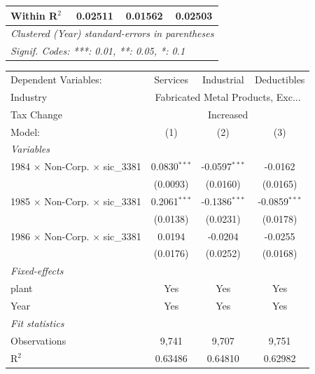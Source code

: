 \documentclass[
  12pt]{article}
\theoremstyle{definition}
\theoremstyle{remark}
\begin{document}
\begin{table}
\begin{minipage}{\linewidth}
\begin{tabular}{lccc}
   Within R$^2$                                  & 0.02511         & 0.01562    & 0.02503\\  
   \midrule \midrule
   \multicolumn{4}{l}{\emph{Clustered (Year) standard-errors in parentheses}}\\
   \multicolumn{4}{l}{\emph{Signif. Codes: ***: 0.01, **: 0.05, *: 0.1}}\\
\end{tabular}
\par\endgroup
\begingroup
\centering
\begin{tabular}{lccc}
   \tabularnewline \midrule \midrule
   Dependent Variables:                          & Services       & Industrial      & Deductibles\\  
   Industry & \multicolumn{3}{c}{Fabricated Metal Products, Exc...} \\ 
   Tax Change & \multicolumn{3}{c}{Increased} \\ 
   Model:                                        & (1)            & (2)             & (3)\\  
   \midrule
   \emph{Variables}\\
   1984 $\times$ Non-Corp. $\times$ sic\_3381    & 0.0830$^{***}$ & -0.0597$^{***}$ & -0.0162\\   
                                                 & (0.0093)       & (0.0160)        & (0.0165)\\   
   1985 $\times$ Non-Corp. $\times$ sic\_3381    & 0.2061$^{***}$ & -0.1386$^{***}$ & -0.0859$^{***}$\\   
                                                 & (0.0138)       & (0.0231)        & (0.0178)\\   
   1986 $\times$ Non-Corp. $\times$ sic\_3381    & 0.0194         & -0.0204         & -0.0255\\   
                                                 & (0.0176)       & (0.0252)        & (0.0168)\\   
   \midrule
   \emph{Fixed-effects}\\
   plant                                         & Yes            & Yes             & Yes\\  
   Year                                          & Yes            & Yes             & Yes\\  
   \midrule
   \emph{Fit statistics}\\
   Observations                                  & 9,741          & 9,707           & 9,751\\  
   R$^2$                                         & 0.63486        & 0.64810         & 0.62982\\  

\end{tabular}
\end{minipage}
\end{table}
\end{document}
